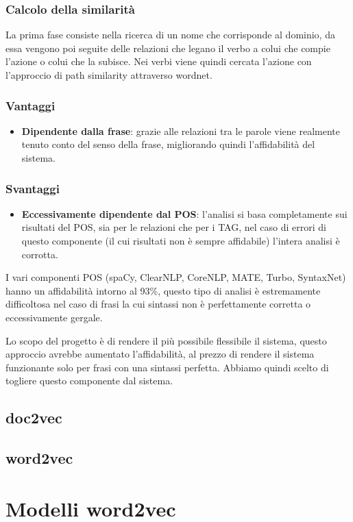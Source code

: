 \documentclass[twoside]{supsistudent}
\begin{document}
\subsection{Calcolo della similarità}
La prima fase consiste nella ricerca di un nome che corrisponde al dominio, da essa vengono poi seguite delle relazioni che legano il verbo a colui che compie l'azione o colui che la subisce. Nei verbi viene quindi cercata l'azione con l'approccio di path similarity attraverso wordnet.
\subsection{Vantaggi}
\begin{itemize}
  \item \textbf{Dipendente dalla frase}: grazie alle relazioni tra le parole viene realmente tenuto conto del senso della frase, migliorando quindi l'affidabilità del sistema.
\end{itemize}
\subsection{Svantaggi}
\begin{itemize}
  \item \textbf{Eccessivamente dipendente dal POS}: l'analisi si basa completamente sui risultati del POS, sia per le relazioni che per i TAG, nel caso di errori di questo componente (il cui risultati non è sempre affidabile) l'intera analisi è corrotta.
\end{itemize}
I vari componenti POS (spaCy, ClearNLP, CoreNLP, MATE, Turbo, SyntaxNet) hanno un affidabilità intorno al 93\%\cite{POS_scores}, questo tipo di analisi è estremamente difficoltosa nel caso di frasi la cui sintassi non è perfettamente corretta o eccessivamente gergale.  

Lo scopo del progetto è di rendere il più possibile flessibile il sistema, questo approccio avrebbe aumentato l'affidabilità, al prezzo di rendere il sistema funzionante solo per frasi con una sintassi perfetta. Abbiamo quindi scelto di togliere questo componente dal sistema.
\section{doc2vec}
\section{word2vec}
\chapter{Modelli word2vec}
\end{document}
